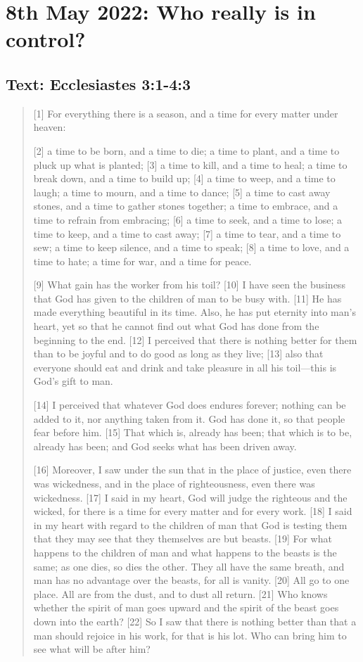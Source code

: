\section{8th May 2022: Who really is in control?}
\subsection*{Text: Ecclesiastes 3:1-4:3}
  \begin{quote}
    [1] For everything there is a season, and a time for every matter under
    heaven:

    [2] a time to be born, and a time to die;
    a time to plant, and a time to pluck up what is planted;
    [3] a time to kill, and a time to heal;
    a time to break down, and a time to build up;
    [4] a time to weep, and a time to laugh;
    a time to mourn, and a time to dance;
    [5] a time to cast away stones, and a time to gather stones together;
    a time to embrace, and a time to refrain from embracing;
    [6] a time to seek, and a time to lose;
    a time to keep, and a time to cast away;
    [7] a time to tear, and a time to sew;
    a time to keep silence, and a time to speak;
    [8] a time to love, and a time to hate;
    a time for war, and a time for peace.


    [9] What gain has the worker from his toil?  [10] I have seen the
    business that God has given to the children of man to be busy with.  [11]
    He has made everything beautiful in its time.  Also, he has put eternity
    into man’s heart, yet so that he cannot find out what God has done from
    the beginning to the end.  [12] I perceived that there is nothing better
    for them than to be joyful and to do good as long as they live; [13] also
    that everyone should eat and drink and take pleasure in all his toil—this
    is God’s gift to man.

    [14] I perceived that whatever God does endures forever; nothing can be
    added to it, nor anything taken from it.  God has done it, so that people
    fear before him.  [15] That which is, already has been; that which is to
    be, already has been; and God seeks what has been driven away.

    [16] Moreover, I saw under the sun that in the place of justice, even
    there was wickedness, and in the place of righteousness, even there was
    wickedness.  [17] I said in my heart, God will judge the righteous and
    the wicked, for there is a time for every matter and for every work.
    [18] I said in my heart with regard to the children of man that God is
    testing them that they may see that they themselves are but beasts.  [19]
    For what happens to the children of man and what happens to the beasts is
    the same; as one dies, so dies the other.  They all have the same breath,
    and man has no advantage over the beasts, for all is vanity.  [20] All go
    to one place.  All are from the dust, and to dust all return.  [21] Who
    knows whether the spirit of man goes upward and the spirit of the beast
    goes down into the earth?  [22] So I saw that there is nothing better
    than that a man should rejoice in his work, for that is his lot.  Who can
    bring him to see what will be after him?


\end{quote}
